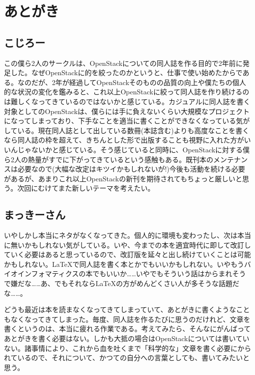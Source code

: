 \documentclass[9pt,b5paper,tombo,openany]{jsbook}
\begin{document}
\chapter{あとがき}

\section*{こじろー}

この僕ら2人のサークルは、OpenStackについての同人誌を作る目的で2年前に発足した。なぜOpenStackに的を絞ったのかというと、仕事で使い始めたからである。なのだが、2年が経過してOpenStackそのものの品質の向上や僕たちの個人的な状況の変化を鑑みると、これ以上OpenStackに絞って同人誌を作り続けるのは難しくなってきているのではないかと感じている。カジュアルに同人誌を書く対象としてのOpenStackは、僕らには手に負えないくらい大規模なプロジェクトになってしまっており、下手なことを適当に書くことができなくなっている気がしている。現在同人誌として出している数冊(本誌含む)よりも高度なことを書くなら同人誌の枠を超えて、きちんとした形で出版することも視野に入れた方がいいんじゃないかと感じている。そう感じていると同時に、OpenStackに対する僕ら2人の熱量がすでに下がってきているという感触もある。既刊本のメンテナンスは必要なので(大幅な改定はキツイかもしれないが!)今後も活動を続ける必要があるが、あまりこれ以上OpenStackの新刊を期待されてもちょっと厳しいと思う。次回にむけてまた新しいテーマを考えたい。

\section*{まっきーさん}

いやしかし本当にネタがなくなってきた。個人的に環境も変わったし、次は本当に無いかもしれない気がしている。いや、今までの本を適宜時代に即して改訂していく必要はあると思っているので、改訂版を延々と出し続けていくことは可能かもしれない。\LaTeX で同人誌を書く本とかでもいいかもしれない。いやもうバイオインフォマティクスの本でもいいか……いやでもそういう話はからまれそうで嫌だな……あ、でもそれなら\LaTeX の方がめんどくさい人が多そうな話題だな……。

どうも最近は本を読まなくなってきてしまっていて、あとがきに書くようなこともなくなってきてしまった。毎度、同人誌を作るたびに思うのだけれど、文章を書くというのは、本当に疲れる作業である。考えてみたら、そんなにがんばってあとがきを書く必要はない。しかも大抵の場合はOpenStackについては書いていない。諸事情により、これから血を吐くまで「科学的な」文章を書く必要にかられているので、それについて、かつての自分への言葉としても、書いてみたいと思う。
\end{document}
